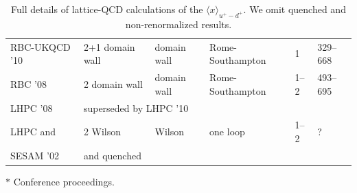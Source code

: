 \begin{table}[!t]
\begin{threeparttable}
\begin{tabular}{llllll}
  RBC-UKQCD '10 \cite{Aoki:2010xg} &
  2+1 domain wall & domain wall & Rome-Southampton & 1 & 329--668 \\

  RBC '08 \cite{Lin:2008uz} &
  2 domain wall & domain wall & Rome-Southampton & 1--2 & 493--695 \\

  LHPC '08 \cite{Hagler:2007xi} &
  \multicolumn{5}{l}{superseded by LHPC '10} \\

  LHPC and &
  2 Wilson & Wilson & one loop & 1--2 & ?\\
  SESAM '02 \cite{Dolgov:2002zm} &
  and quenched & & & \\
\bottomrule
\end{tabular}
\begin{tablenotes}
\scriptsize
\item[$*$] Conference proceedings.
\end{tablenotes}
\end{threeparttable}
\caption{\small Full details of lattice-QCD calculations of the 
$\langle x\rangle_{u^+-d^+}$. We omit quenched and non-renormalized results.}
\label{tab:unpolarizedisotriplet}
\end{table}

